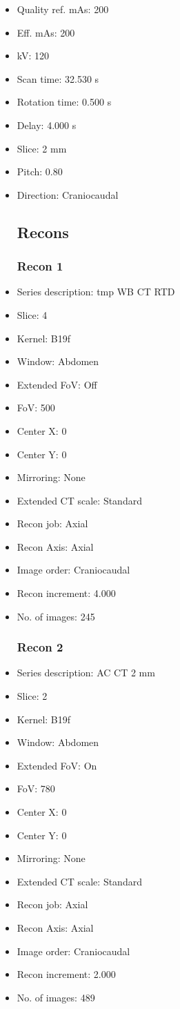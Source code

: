 \documentclass[12pt]{article}
\begin{document}
\begin{itemize}
\subsection{Scan}
\item Quality ref. mAs: 200\item Eff. mAs: 200\item kV: 120\item Scan time: 32.530 s\item Rotation time: 0.500 s\item Delay: 4.000 s\item Slice: 2 mm\item Pitch: 0.80\item Direction: Craniocaudal\subsection{Recons}

\subsubsection{Recon 1}
\item Series description: tmp WB CT RTD
\item Slice: 4
\item Kernel: B19f
\item Window: Abdomen
\item Extended FoV: Off
\item FoV: 500
\item Center X: 0
\item Center Y: 0
\item Mirroring: None
\item Extended CT scale: Standard
\item Recon job: Axial
\item Recon Axis: Axial
\item Image order: Craniocaudal
\item Recon increment: 4.000
\item No. of images: 245
\subsubsection{Recon 2}
\item Series description: AC CT 2 mm
\item Slice: 2
\item Kernel: B19f
\item Window: Abdomen
\item Extended FoV: On
\item FoV: 780
\item Center X: 0
\item Center Y: 0
\item Mirroring: None
\item Extended CT scale: Standard
\item Recon job: Axial
\item Recon Axis: Axial
\item Image order: Craniocaudal
\item Recon increment: 2.000
\item No. of images: 489

\end{itemize}
\end{document}
